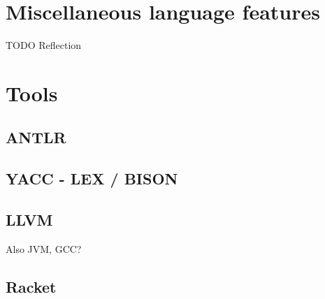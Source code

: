 \section{Miscellaneous language features}
TODO Reflection


\section{Tools}
\subsection{ANTLR}
\subsection{YACC - LEX / BISON}
\subsection{LLVM}
Also JVM, GCC?
\subsection{Racket}
